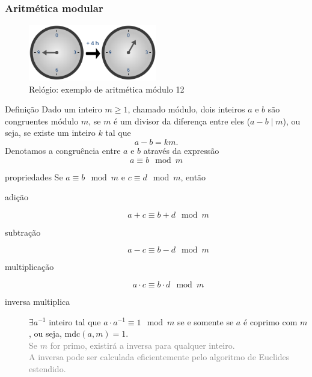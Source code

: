 \begin{frame}[allowframebreaks]
\frametitle{Aritmética modular}

\begin{figure}
  \centering
  \includegraphics[width=0.5\textwidth]{clock_group.png}
  \caption{Relógio: exemplo de aritmética módulo 12}\label{fig-clockgroup}
\end{figure}

\begin{block}{Definição}
Dado um inteiro $m \geq 1$, chamado módulo, dois inteiros $a$ e $b$ são congruentes módulo $m$, se $m$ é um divisor da diferença entre eles ($a-b \mid m$), ou seja,
se existe um inteiro $k$ tal que
\begin{equation}
  a - b = k m.
\end{equation}
Denotamos a congruência entre $a$ e $b$ através da expressão
\begin{equation}
  a \equiv b \mod m
\end{equation}
\end{block}

\begin{block}{propriedades}
Se $a \equiv b \mod m$ e $c \equiv d \mod m$, então
\begin{description}
  \item[adição]
    \begin{equation}
      a + c \equiv b + d \mod m
    \end{equation}
  \item[subtração]
    \begin{equation}
      a - c \equiv b - d \mod m
    \end{equation}
  \item[multiplicação]
    \begin{equation}
      a \cdot c \equiv b \cdot d \mod m
    \end{equation}
  \item[inversa multiplica] $\exists a^{-1}$ inteiro tal que $a \cdot a^{-1} \equiv 1 \mod m$ se e somente se 
    $a$ é coprimo com $m$, ou seja, $\text{mdc}(a,m) = 1$. \\
    \textcolor{gray}{Se $m$ for primo, existirá a inversa para qualquer inteiro.} \\
    \textcolor{gray}{A inversa pode ser calculada eficientemente pelo algoritmo de Euclides estendido.}
\end{description}
\end{block}


\end{frame}
